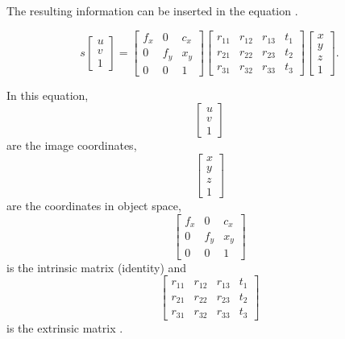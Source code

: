 The resulting information can be inserted in the equation \label{eq:pipeline}.\\
\begin{figure}
\label{eq:pipeline}
\begin{equation}
s \left[ \begin{array}{ccc} 
u\\
v\\
1 \end{array} \right] = 
\left[ \begin{array}{ccc} 
f_{x} & 0 & c_{x}\\
0 & f_{y} & x_{y}\\
0 & 0 & 1 \end{array} \right] 
\left[ \begin{array}{cccc} 
r_{11} & r_{12} & r_{13} & t_{1}\\
r_{21} & r_{22} & r_{23} & t_{2}\\
r_{31} & r_{32} & r_{33} & t_{3} \end{array} \right] 
\left[ \begin{array}{ccc} 
x\\
y\\
z\\
1  \end{array} \right] 
.
\end{equation}
\end{figure}
In this equation,
$$
\left[ \begin{array}{ccc} 
u\\
v\\
1 \end{array} \right]
$$
are the image coordinates,
$$
\left[ \begin{array}{ccc} 
x\\
y\\
z\\
1  \end{array} \right] 
$$
are the coordinates in object space,
$$
\left[ \begin{array}{ccc} 
f_{x} & 0 & c_{x}\\
0 & f_{y} & x_{y}\\
0 & 0 & 1 \end{array} \right]
$$
is the intrinsic matrix (identity) and
$$
\left[ \begin{array}{cccc} 
r_{11} & r_{12} & r_{13} & t_{1}\\
r_{21} & r_{22} & r_{23} & t_{2}\\
r_{31} & r_{32} & r_{33} & t_{3}
\end{array} \right]
$$
is the extrinsic matrix \cite{OPENCV}.

